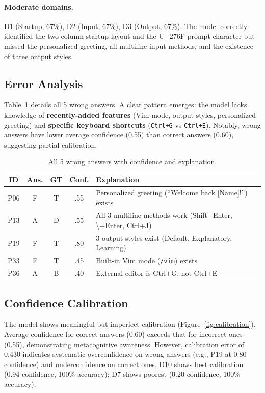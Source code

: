 \documentclass[10pt,twocolumn]{article}
\begin{document}
\paragraph{Moderate domains.}
D1 (Startup, 67\%), D2 (Input, 67\%), D3 (Output, 67\%).
The model correctly identified the two-column startup layout and the U+276F prompt character but missed the personalized greeting, all multiline input methods, and the existence of three output styles.

\subsection{Error Analysis}

Table~\ref{tab:errors} details all 5 wrong answers.
A clear pattern emerges: the model lacks knowledge of \textbf{recently-added features} (Vim mode, output styles, personalized greeting) and \textbf{specific keyboard shortcuts} (\texttt{Ctrl+G} vs \texttt{Ctrl+E}).
Notably, wrong answers have lower average confidence (0.55) than correct answers (0.60), suggesting partial calibration.

\begin{table}[t]
\centering
\caption{All 5 wrong answers with confidence and explanation.}
\label{tab:errors}
\small
\begin{tabular}{@{}ccccp{2.8cm}@{}}
\toprule
\textbf{ID} & \textbf{Ans.} & \textbf{GT} & \textbf{Conf.} & \textbf{Explanation} \\
\midrule
P06 & F & T & .55 & Personalized greeting (``Welcome back [Name]!'') exists \\
P13 & A & D & .55 & All 3 multiline methods work (Shift+Enter, \textbackslash+Enter, Ctrl+J) \\
P19 & F & T & .80 & 3 output styles exist (Default, Explanatory, Learning) \\
P33 & F & T & .45 & Built-in Vim mode (\texttt{/vim}) exists \\
P36 & A & B & .40 & External editor is Ctrl+G, not Ctrl+E \\
\bottomrule
\end{tabular}
\end{table}

\subsection{Confidence Calibration}

The model shows meaningful but imperfect calibration (Figure~\ref{fig:calibration}).
Average confidence for correct answers (0.60) exceeds that for incorrect ones (0.55), demonstrating metacognitive awareness.
However, calibration error of 0.430 indicates systematic overconfidence on wrong answers (e.g., P19 at 0.80 confidence) and underconfidence on correct ones.
D10 shows best calibration (0.94 confidence, 100\% accuracy); D7 shows poorest (0.20 confidence, 100\% accuracy).
\end{document}
